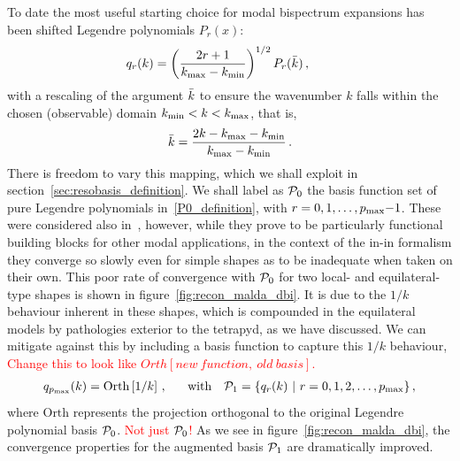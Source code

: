 To date the most useful starting choice for modal bispectrum expansions has been shifted Legendre polynomials $P_r(x)$:
\begin{align}\label{P0_definition}
    q_{r}(k) = \left(\frac{2r+1} {{k_\text{max}} - {k_\text{min}}}\right)^{1/2} P_r(\bar{k})\,,\qquad 
\end{align}
with a rescaling of the argument $\bar{k}$ to ensure the wavenumber $k$ falls within the chosen (observable) domain ${k_\text{min}}< k<{k_\text{max}}$, that is, 
\begin{align}\label{krescaled}
    \bar{k}=\frac{2k-{k_\text{max}}-{k_\text{min}}}{{k_\text{max}}-{k_\text{min}}}\,.
\end{align}
There is freedom to vary this mapping, which we shall exploit in section~\ref{sec:resobasis_definition}.
We shall label as $\mathcal{P}_0$ the basis function set of pure Legendre polynomials in~\eqref{P0_definition},
with $r=0,1,\dots, p_{\rm max}\text{$-$}1$.
These were considered also in~\cite{Funakoshi}, however,
while they prove to be particularly functional building blocks for other modal applications,
in the context of the in-in formalism
they converge so slowly even for simple shapes as to be inadequate when taken on their own.
This poor rate of convergence with $\mathcal{P}_0$ for two local- and equilateral-type shapes is shown in figure~\ref{fig:recon_malda_dbi}.
It is due to the $1/k$ behaviour inherent in these shapes,
which is compounded in the equilateral models by pathologies exterior to the tetrapyd,
as we have discussed.
We can mitigate against this by including a basis function to capture this $1/k$ behaviour, 
\textcolor{red}{Change this to look like $Orth[new~function,~old~basis]$.}
\begin{align}\label{P1_definition}
    q_{p_{\rm max}}(k) = \text{Orth}\left[{1}/ {k}\right]\,, ~~ \quad \text{with} \quad  \mathcal{P}_1 = \{ q_r(k) ~\vert~ r= 0, 1,2, \dots , p_{\rm max}\}\,,
\end{align}
where $\text{Orth}$ represents the projection orthogonal to the original Legendre polynomial basis $\mathcal{P}_0$.
\textcolor{red}{Not just $\mathcal{P}_0$!}
As we see in figure~\ref{fig:recon_malda_dbi}, the convergence properties for the augmented basis  $\mathcal{P}_1$ are dramatically improved.

